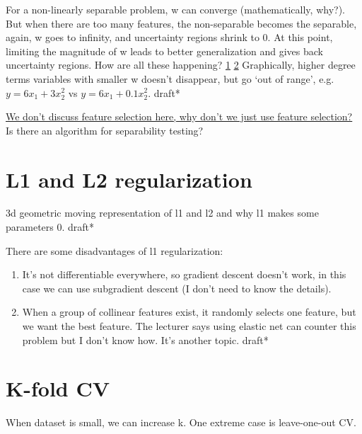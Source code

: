 \documentclass{report}
\begin{document}
For a non-linearly separable problem, w can converge (mathematically, why?). But when there are too many features, the non-separable becomes the separable, again, w goes to infinity, and uncertainty regions shrink to 0. At this point, limiting the magnitude of w leads to better generalization  and gives back uncertainty regions. How are all these happening? \href{https://stackoverflow.com/questions/24666312/why-limit-the-weight-size-can-prevent-overfitting-in-machine-learning}{1} \href{https://stackoverflow.com/questions/34569903/how-does-having-smaller-values-for-parameters-help-in-preventing-over-fitting}{2} Graphically, higher degree terms variables with smaller w doesn't disappear, but go `out of range', e.g. $y = 6x_1 + 3x_2^2$ vs $y = 6x_1 + 0.1x_2^2$. draft* 

\href{https://stats.stackexchange.com/q/569381/354019}{We don't discuss feature selection here, why don't we just use feature selection?} Is there an algorithm for separability testing?
\section{L1 and L2 regularization}
3d geometric moving representation of l1 and l2 and why l1 makes some parameters 0. draft*

There are some disadvantages of l1 regularization:
\begin{enumerate}
	\item It's not differentiable everywhere, so gradient descent doesn't work, in this case we can use subgradient descent (I don't need to know the details).
	\item When a group of collinear features exist, it randomly selects one feature, but we want the best feature. The lecturer says using elastic net can counter this problem but I don't know how. It's another topic. draft*
\end{enumerate}

\section{K-fold CV}
When dataset is small, we can increase k. One extreme case is leave-one-out CV.
\end{document}

